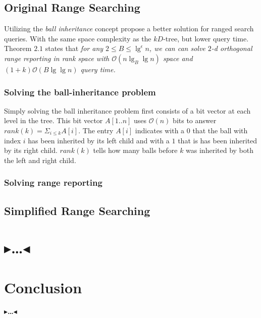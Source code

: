 \documentclass[twoside,11pt,openright]{report}
\newcommand{\todo}[1]{{\color[rgb]{.5,0,0}\textbf{$\blacktriangleright$#1$\blacktriangleleft$}}}
\begin{document}
\section{Original Range Searching}
Utilizing the \emph{ball inheritance} concept \citeauthor{chanetal} propose a better solution for ranged search queries. With the same space complexity as the $kD$-tree, but lower query time. Theorem $2.1$ states that \emph{for any $2 \leq B \leq \lg^\epsilon n$, we can can solve $2$-d orthogonal range reporting in rank space with $\mathcal{O}(n \lg_B \lg n)$ space and $(1+k)\mathcal{O}(B \lg \lg n)$ query time.}

\subsection{Solving the ball-inheritance problem} 



Simply solving the ball inheritance problem first consists of a bit vector at each level in the tree. This bit vector $A[1..n]$ uses $\mathcal{O}(n)$ bits to answer $rank(k) = \Sigma_{i \leq k} A[i]$. The entry $A[i]$ indicates with a $0$ that the ball with index $i$ has been inherited by its left child and with a $1$ that is has been inherited by its right child. $rank(k)$ tells how many balls before $k$ was inherited by both the left and right child.

\subsection{Solving range reporting}


\section{Simplified Range Searching}

\chapter{\todo{\dots}}
\label{ch:main}



\chapter{Conclusion}
\label{ch:conclusion}

\todo{\dots}


 

\end{document}
